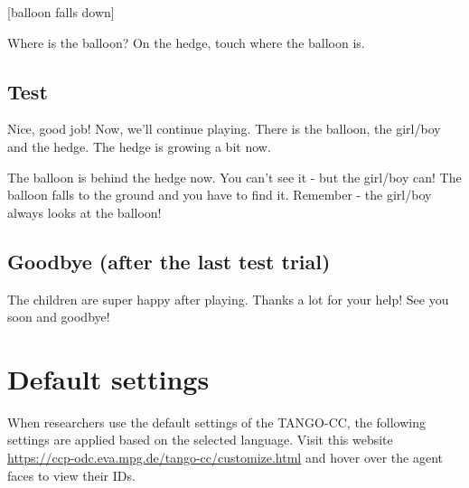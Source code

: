 \documentclass[
  man,floatsintext]{apa7}
\begin{document}
{[}balloon falls down{]}

Where is the balloon? On the hedge, touch where the balloon is.

\subsection{Test}\label{test}

Nice, good job! Now, we'll continue playing. There is the balloon, the girl/boy and the hedge. The hedge is growing a bit now.

The balloon is behind the hedge now. You can't see it - but the girl/boy can! The balloon falls to the ground and you have to find it. Remember - the girl/boy always looks at the balloon!

\subsection{Goodbye (after the last test trial)}\label{goodbye-after-the-last-test-trial}

The children are super happy after playing. Thanks a lot for your help! See you soon and goodbye!

\section{Default settings}\label{default-settings}

When researchers use the default settings of the TANGO-CC, the following settings are applied based on the selected language. Visit this website \url{https://ccp-odc.eva.mpg.de/tango-cc/customize.html} and hover over the agent faces to view their IDs.
\end{document}
